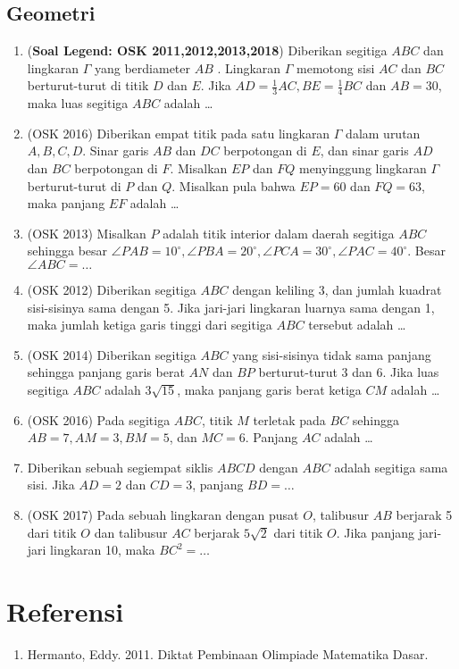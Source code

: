     \subsection{Geometri}
        \begin{enumerate}
            \item (\textbf{Soal Legend: OSK 2011,2012,2013,2018}) Diberikan segitiga $ABC$ dan lingkaran $\Gamma$ yang berdiameter $AB$ . Lingkaran $\Gamma$ memotong sisi $AC$ dan $BC$ berturut-turut di titik $D$ dan $E$. Jika $AD = \frac13 AC, BE =\frac14 BC$ dan $AB = 30$, maka luas segitiga $ABC$ adalah \dots
            
            \item (OSK 2016) Diberikan empat titik pada satu lingkaran $\Gamma$ dalam urutan $A,B,C,D$. Sinar garis $AB$ dan $DC$ berpotongan di $E$, dan sinar garis $AD$ dan $BC$ berpotongan di $F$. Misalkan $EP$ dan $FQ$ menyinggung lingkaran $\Gamma$ berturut-turut di $P$ dan $Q$. Misalkan pula bahwa $EP=60$ dan $FQ=63$, maka panjang $EF$ adalah \dots
            
            \item (OSK 2013) Misalkan $P$ adalah titik interior dalam daerah segitiga $ABC$ sehingga besar $\angle PAB = 10^\circ, \angle PBA = 20^\circ, \angle PCA = 30^\circ, \angle PAC=40^\circ$. Besar $\angle ABC = \dots$
            
            \item (OSK 2012) Diberikan segitiga $ABC$ dengan keliling 3, dan jumlah kuadrat sisi-sisinya sama dengan 5. Jika jari-jari lingkaran luarnya sama dengan 1, maka jumlah ketiga garis tinggi dari segitiga $ABC$ tersebut adalah \dots
            
            \item (OSK 2014) Diberikan segitiga $ABC$ yang sisi-sisinya tidak sama panjang sehingga panjang garis berat $AN$ dan $BP$ berturut-turut 3 dan 6. Jika luas segitiga $ABC$ adalah $3\sqrt{15}$, maka panjang garis berat ketiga $CM$ adalah \dots
            
            \item (OSK 2016) Pada segitiga $ABC$, titik $M$ terletak pada $BC$ sehingga $AB=7, AM=3, BM=5$, dan $MC=6$. Panjang $AC$ adalah \dots
            
            \item Diberikan sebuah segiempat siklis $ABCD$ dengan $ABC$ adalah segitiga sama sisi. Jika $AD=2$ dan $CD=3$, panjang $BD=\dots$
            
            \item (OSK 2017) Pada sebuah lingkaran dengan pusat $O$, talibusur $AB$ berjarak 5 dari titik $O$ dan talibusur $AC$ berjarak $5\sqrt{2}$ dari titik $O$. Jika panjang jari-jari lingkaran 10, maka $BC^2=\dots$
        \end{enumerate}
            \section{Referensi}
        \begin{enumerate}
            \item Hermanto, Eddy. 2011. Diktat Pembinaan Olimpiade Matematika Dasar.
        \end{enumerate}